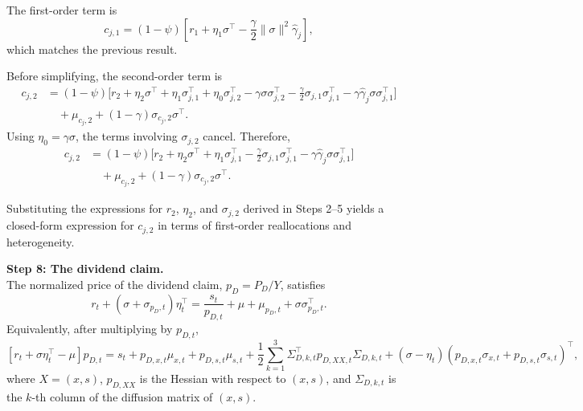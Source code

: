 The first-order term is
\begin{equation}
    c_{j,1}
    =
    (1-\psi)
    \left[
        r_1
        + \eta_1\sigma^\top
        - \frac{\gamma}{2}\|\sigma\|^2 \hat{\gamma}_j
    \right],
\end{equation}
which matches the previous result.

Before simplifying, the second-order term is
\begin{align}
    c_{j,2} &= (1-\psi)\Big[
        r_2
        + \eta_2\sigma^\top
        + \eta_1\sigma_{j,1}^\top
        + \eta_0\sigma_{j,2}^\top
        - \gamma\sigma\sigma_{j,2}^\top
        - \frac{\gamma}{2}\sigma_{j,1}\sigma_{j,1}^\top
        - \gamma\hat{\gamma}_j\sigma\sigma_{j,1}^\top
    \Big] \nonumber\\
    &\quad + \mu_{c_j,2}
    + (1-\gamma)\sigma_{c_j,2}\sigma^\top.
\end{align}
Using $\eta_0=\gamma\sigma$, the terms involving $\sigma_{j,2}$ cancel.
Therefore,
\begin{align}
    c_{j,2} &= (1-\psi)\Big[
        r_2
        + \eta_2\sigma^\top
        + \eta_1\sigma_{j,1}^\top
        - \frac{\gamma}{2}\sigma_{j,1}\sigma_{j,1}^\top
        - \gamma\hat{\gamma}_j\sigma\sigma_{j,1}^\top
    \Big] \nonumber\\
    &\quad + \mu_{c_j,2}
    + (1-\gamma)\sigma_{c_j,2}\sigma^\top.
\end{align}

Substituting the expressions for $r_2$, $\eta_2$, and $\sigma_{j,2}$ derived in Steps 2--5 yields a closed-form expression for $c_{j,2}$ in terms of first-order reallocations and heterogeneity.

\noindent\textbf{Step 8: The dividend claim.}\\
The normalized price of the dividend claim, $p_D=P_D/Y$, satisfies
\begin{equation}
    r_t + (\sigma+\sigma_{p_D,t})\eta_t^\top
    = \frac{s_t}{p_{D,t}} + \mu + \mu_{p_D,t} + \sigma\sigma_{p_D,t}^\top.
\end{equation}
Equivalently, after multiplying by $p_{D,t}$,
\begin{equation}\label{eq:pD-pricing-condition}
    \left[r_t+\sigma\eta_t^\top-\mu\right]p_{D,t}
    = s_t + p_{D,x,t}\mu_{x,t}+p_{D,s,t}\mu_{s,t}
    +\frac{1}{2}\sum_{k=1}^3 \Sigma_{D,k,t}^\top p_{D,XX,t}\Sigma_{D,k,t}
    +(\sigma-\eta_t)\left(p_{D,x,t}\sigma_{x,t}+p_{D,s,t}\sigma_{s,t}\right)^\top,
\end{equation}
where $X=(x,s)$, $p_{D,XX}$ is the Hessian with respect to $(x,s)$, and $\Sigma_{D,k,t}$ is the $k$-th column of the diffusion matrix of $(x,s)$.

